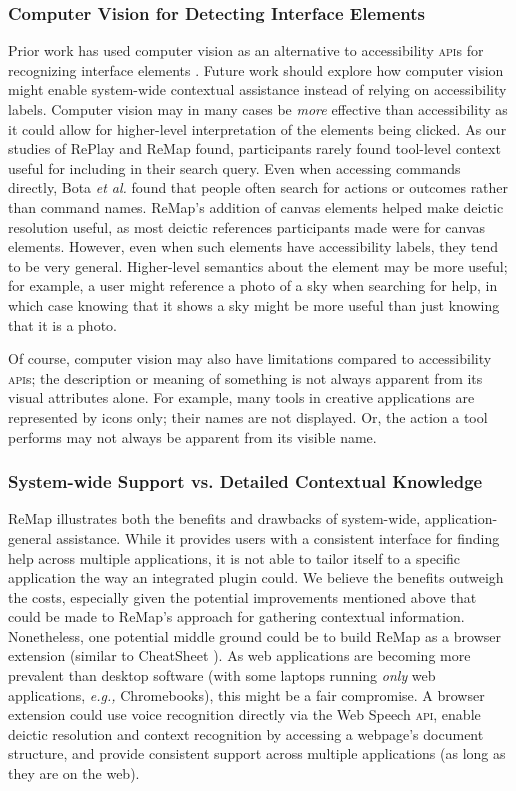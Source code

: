 \subsubsection{Computer Vision for Detecting Interface Elements}
Prior work has used computer vision as an alternative to accessibility \textsc{api}s for recognizing interface elements \cite{Chang2011, Hurst2010, Dixon2010}. Future work should explore how computer vision might enable system-wide contextual assistance instead of relying on accessibility labels. Computer vision may in many cases be \textit{more} effective than accessibility as it could allow for higher-level interpretation of the elements being clicked. As our studies of RePlay and ReMap found, participants rarely found tool-level context useful for including in their search query. Even when accessing commands directly, Bota \textit{et al.} \cite{Bota2018} found that people often search for actions or outcomes rather than command names. ReMap's addition of canvas elements helped make deictic resolution useful, as most deictic references participants made were for canvas elements. However, even when such elements have accessibility labels, they tend to be very general. Higher-level semantics about the element may be more useful; for example, a user might reference a photo of a sky when searching for help, in which case knowing that it shows a sky might be more useful than just knowing that it is a photo. 

Of course, computer vision may also have limitations compared to accessibility \textsc{api}s; the description or meaning of something is not always apparent from its visual attributes alone. For example, many tools in creative applications are represented by icons only; their names are not displayed. Or, the action a tool performs may not always be apparent from its visible name.

\subsubsection{System-wide Support vs. Detailed Contextual Knowledge}
ReMap illustrates both the benefits and drawbacks of system-wide, application-general assistance. While it provides users with a consistent interface for finding help across multiple applications, it is not able to tailor itself to a specific application the way an integrated plugin could. We believe the benefits outweigh the costs, especially given the potential improvements mentioned above that could be made to ReMap's approach for gathering contextual information. Nonetheless, one potential middle ground could be to build ReMap as a browser extension (similar to CheatSheet \cite{Vermette2015}). As web applications are becoming more prevalent than desktop software (with some laptops running \textit{only} web applications, \textit{e.g.,} Chromebooks), this might be a fair compromise. A browser extension could use voice recognition directly via the Web Speech \textsc{api}, enable deictic resolution and context recognition by accessing a webpage's document structure, and provide consistent support across multiple applications (as long as they are on the web).


